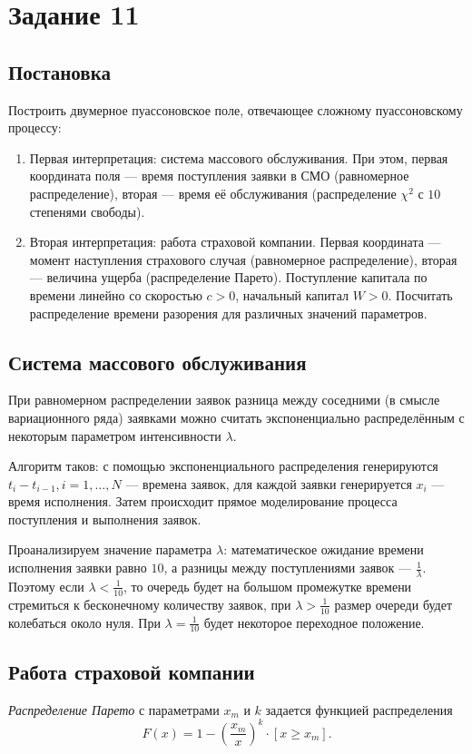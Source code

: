 \documentclass[12pt, a4paper]{article}
\begin{document}
\section*{Задание 11}
\subsection*{Постановка}
Построить двумерное пуассоновское поле, отвечающее сложному пуассоновскому процессу:
\begin{enumerate}
	\item Первая интерпретация: система массового обслуживания. При этом, первая координата поля --- время поступления заявки в СМО (равномерное распределение), вторая --- время её обслуживания (распределение $\chi^2$ с $10$ степенями свободы).
	\item Вторая интерпретация: работа страховой компании. Первая координата --- момент наступления страхового случая (равномерное распределение), вторая --- величина ущерба (распределение Парето). Поступление капитала по времени линейно со скоростью $c>0$, начальный капитал $W>0$. Посчитать распределение времени разорения для различных значений параметров.
\end{enumerate}

\subsection*{Система массового обслуживания}
При равномерном распределении заявок разница между соседними (в смысле вариационного ряда) заявками можно считать экспоненциально распределённым с некоторым параметром интенсивности $\lambda$.

Алгоритм таков: с помощью экспоненциального распределения генерируются $t_i-t_{i-1}, i=1,\dots,N$ --- времена заявок, для каждой заявки генерируется $x_i$ --- время исполнения.
Затем происходит прямое моделирование процесса поступления и выполнения заявок.

Проанализируем значение параметра $\lambda$: математическое ожидание времени исполнения заявки равно $10$, а разницы между поступлениями заявок --- $\frac 1\lambda$. Поэтому если $\lambda<\frac 1{10}$, то очередь будет на большом промежутке времени стремиться к бесконечному количеству заявок, при $\lambda > \frac 1{10}$ размер очереди будет колебаться около нуля. При $\lambda = \frac 1 {10}$ будет некоторое переходное положение.

\subsection*{Работа страховой компании}
\begin{df}
	\textit{Распределение Парето} с параметрами $x_m$ и $k$ задается функцией распределения 
	\[F(x)=1-\left(\frac{x_m}{x} \right)^k\cdot[x\geqslant x_m].\]
\end{df}
\end{document}
